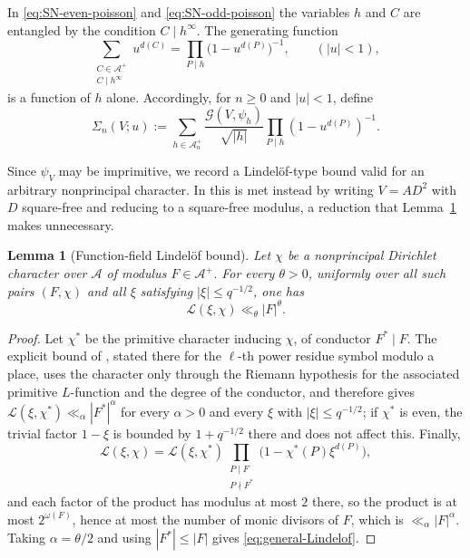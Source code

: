 \documentclass[a4paper,reqno]{amsart}
\numberwithin{equation}{section}
\newtheorem{lemma}[theorem]{Lemma}
\theoremstyle{remark}
\theoremstyle{definition}
\newcommand{\A}{\mathcal{A}}
\newcommand{\Gc}{\mathcal{G}}
\begin{document}
In \eqref{eq:SN-even-poisson} and \eqref{eq:SN-odd-poisson} the variables
$h$ and $C$ are entangled by the condition $C\mid h^\infty$. The generating
function
\begin{equation}\label{eq:Cgen}
\sum_{\substack{C\in\A^+\\ C\mid h^\infty}}u^{d(C)}
=\prod_{P\mid h}\bigl(1-u^{d(P)}\bigr)^{-1},
\qquad (|u|<1),
\end{equation}
is a function of $h$ alone. Accordingly, for $n\ge0$ and $|u|<1$, define
\begin{equation}\label{eq:Sigma-nonsquare-def}
\Sigma_n(V;u)
:=
\sum_{h\in\A_n^+}
\frac{\Gc(V,\psi_h)}{\sqrt{|h|}}
\prod_{P\mid h}
\left(1-u^{d(P)}\right)^{-1}.
\end{equation}

Since $\psi_V$ may be imprimitive, we record a Lindel\"of-type bound valid
for an arbitrary nonprincipal character. In \cite[Section~7]{Fl17-1} this is
met instead by writing $V=AD^2$ with $D$ square-free and reducing to a
square-free modulus, a reduction that Lemma~\ref{lem:general-Lindelof} makes
unnecessary.

\begin{lemma}[Function-field Lindel\"of bound]
\label{lem:general-Lindelof}
Let $\chi$ be a nonprincipal Dirichlet character over $\A$ of modulus
$F\in\A^+$. For every $\theta>0$, uniformly over all such pairs
$(F,\chi)$ and all $\xi$ satisfying $|\xi|\le q^{-1/2}$, one has
\begin{equation}\label{eq:general-Lindelof}
\mathcal L(\xi,\chi)
\ll_\theta
|F|^\theta.
\end{equation}
\end{lemma}

\begin{proof}
Let $\chi^*$ be the primitive character inducing $\chi$, of conductor
$F^*\mid F$. The explicit bound of \cite[Theorem~20]{BCDGLD18}, stated
there for the $\ell$-th power residue symbol modulo a place, uses the
character only through the Riemann hypothesis for the associated primitive
$L$-function and the degree of the conductor, and therefore gives
$\mathcal L(\xi,\chi^*)\ll_\alpha|F^*|^\alpha$ for every $\alpha>0$ and
every $\xi$ with $|\xi|\le q^{-1/2}$; if $\chi^*$ is even, the trivial
factor $1-\xi$ is bounded by $1+q^{-1/2}$ there and does not affect this.
Finally,
$$
\mathcal L(\xi,\chi)=\mathcal L(\xi,\chi^*)
\prod_{\substack{P\mid F\\ P\nmid F^*}}\bigl(1-\chi^*(P)\xi^{d(P)}\bigr),
$$
and each factor of the product has modulus at most $2$ there, so the product
is at most $2^{\omega(F)}$, hence at most the number of monic divisors of
$F$, which is $\ll_\alpha|F|^\alpha$. Taking $\alpha=\theta/2$ and using
$|F^*|\le|F|$ gives \eqref{eq:general-Lindelof}.
\end{proof}
\end{document}
